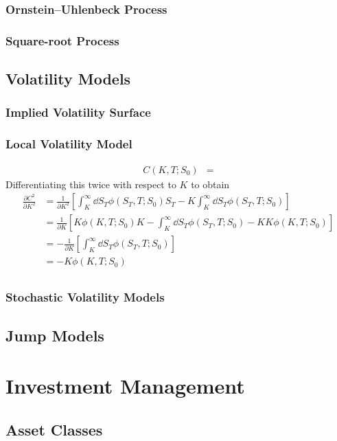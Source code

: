 \documentclass{book}
\begin{document}
\subsection{Ornstein--Uhlenbeck Process}
\subsection{Square-root Process}
\section{Volatility Models}
\subsection{Implied Volatility Surface}
\subsection{Local Volatility Model}
\begin{align}
	C(K, T; S_0) &= 
\end{align}
Differentiating this twice with respect to $K$ to obtain
\begin{align}
	\frac{\partial C^2}{\partial K^2} &= \frac{1}{\partial K^2} \left[\int_K^\infty \dd S_T \phi(S_T, T; S_0) S_T - K \int_K^\infty \dd S_T \phi(S_T, T; S_0) \right]\\
	&= \frac{1}{\partial K} \left[K \phi(K, T; S_0) K - \int_K^\infty \dd S_T \phi(S_T, T; S_0) - K K \phi(K, T; S_0) \right]\\
	&= - \frac{1}{\partial K} \left[ \int_K^\infty \dd S_T \phi(S_T, T; S_0)\right]\\
	&= - K \phi(K, T; S_0) \\
\end{align}


\subsection{Stochastic Volatility Models}
\section{Jump Models}



\chapter{Investment Management}
\section{Asset Classes}
\end{document}
